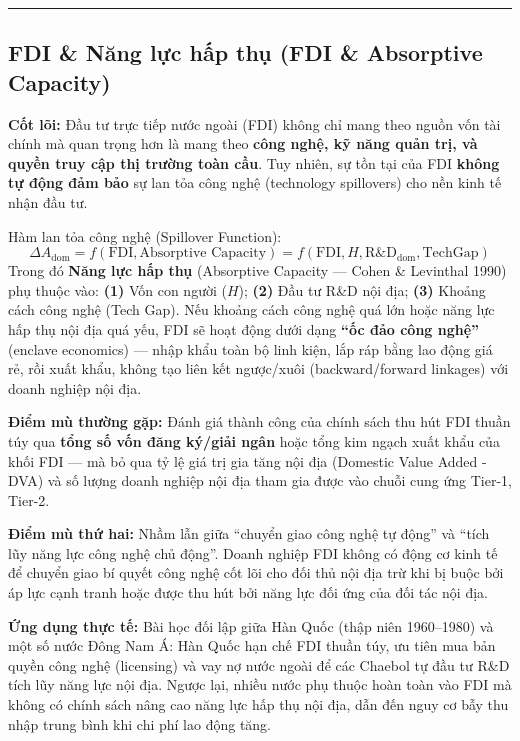 \documentclass[
]{article}
\begin{document}
\begin{center}\rule{0.5\linewidth}{0.5pt}\end{center}

\subsection{FDI \& Năng lực hấp thụ (FDI \& Absorptive
Capacity)}\label{fdi-nux103ng-lux1ef1c-hux1ea5p-thux1ee5-fdi-absorptive-capacity}

\textbf{Cốt lõi:} Đầu tư trực tiếp nước ngoài (FDI) không chỉ mang theo
nguồn vốn tài chính mà quan trọng hơn là mang theo \textbf{công nghệ, kỹ
năng quản trị, và quyền truy cập thị trường toàn cầu}. Tuy nhiên, sự tồn
tại của FDI \textbf{không tự động đảm bảo} sự lan tỏa công nghệ
(technology spillovers) cho nền kinh tế nhận đầu tư.

Hàm lan tỏa công nghệ (Spillover Function):
\[ \Delta A_{\text{dom}} = f\left(\text{FDI}, \text{Absorptive Capacity}\right) = f\left(\text{FDI}, H, \text{R\&D}_{\text{dom}}, \text{TechGap}\right) \]
Trong đó \textbf{Năng lực hấp thụ} (Absorptive Capacity --- Cohen \&
Levinthal 1990) phụ thuộc vào: \textbf{(1)} Vốn con người (\(H\));
\textbf{(2)} Đầu tư R\&D nội địa; \textbf{(3)} Khoảng cách công nghệ
(Tech Gap). Nếu khoảng cách công nghệ quá lớn hoặc năng lực hấp thụ nội
địa quá yếu, FDI sẽ hoạt động dưới dạng \textbf{``ốc đảo công nghệ''}
(enclave economics) --- nhập khẩu toàn bộ linh kiện, lắp ráp bằng lao
động giá rẻ, rồi xuất khẩu, không tạo liên kết ngược/xuôi
(backward/forward linkages) với doanh nghiệp nội địa.

\textbf{Điểm mù thường gặp:} Đánh giá thành công của chính sách thu hút
FDI thuần túy qua \textbf{tổng số vốn đăng ký/giải ngân} hoặc tổng kim
ngạch xuất khẩu của khối FDI --- mà bỏ qua tỷ lệ giá trị gia tăng nội
địa (Domestic Value Added - DVA) và số lượng doanh nghiệp nội địa tham
gia được vào chuỗi cung ứng Tier-1, Tier-2.

\textbf{Điểm mù thứ hai:} Nhầm lẫn giữa ``chuyển giao công nghệ tự
động'' và ``tích lũy năng lực công nghệ chủ động''. Doanh nghiệp FDI
không có động cơ kinh tế để chuyển giao bí quyết công nghệ cốt lõi cho
đối thủ nội địa trừ khi bị buộc bởi áp lực cạnh tranh hoặc được thu hút
bởi năng lực đối ứng của đối tác nội địa.

\textbf{Ứng dụng thực tế:} Bài học đối lập giữa Hàn Quốc (thập niên
1960--1980) và một số nước Đông Nam Á: Hàn Quốc hạn chế FDI thuần túy,
ưu tiên mua bản quyền công nghệ (licensing) và vay nợ nước ngoài để các
Chaebol tự đầu tư R\&D tích lũy năng lực nội địa. Ngược lại, nhiều nước
phụ thuộc hoàn toàn vào FDI mà không có chính sách nâng cao năng lực hấp
thụ nội địa, dẫn đến nguy cơ bẫy thu nhập trung bình khi chi phí lao
động tăng.
\end{document}
